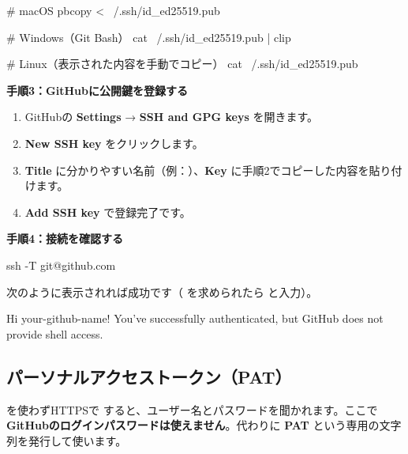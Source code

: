 \begin{codebox}[bash]
\begin{code}
# macOS
pbcopy < ~/.ssh/id_ed25519.pub

# Windows（Git Bash）
cat ~/.ssh/id_ed25519.pub | clip

# Linux（表示された内容を手動でコピー）
cat ~/.ssh/id_ed25519.pub
\end{code}
\end{codebox}

\noindent\textbf{手順3：GitHubに公開鍵を登録する}

\begin{enumerate}[leftmargin=1.6em]
  \item GitHubの \textbf{Settings} → \textbf{SSH and GPG keys} を開きます。
  \item \textbf{New SSH key} をクリックします。
  \item \textbf{Title} に分かりやすい名前（例：）、\textbf{Key} に手順2でコピーした内容を貼り付けます。
  \item \textbf{Add SSH key} で登録完了です。
\end{enumerate}


\noindent\textbf{手順4：接続を確認する}

\begin{codebox}[bash]
\begin{code}
ssh -T git@github.com
\end{code}
\end{codebox}

次のように表示されれば成功です（ を求められたら  と入力）。

\begin{codebox}[text]
\begin{code}
Hi your-github-name! You've successfully authenticated, but GitHub does not provide shell access.
\end{code}
\end{codebox}

\subsection{パーソナルアクセストークン（PAT）}

 を使わずHTTPSで  すると、ユーザー名とパスワードを聞かれます。ここで\textbf{GitHubのログインパスワードは使えません}。代わりに \textbf{PAT} という専用の文字列を発行して使います。


